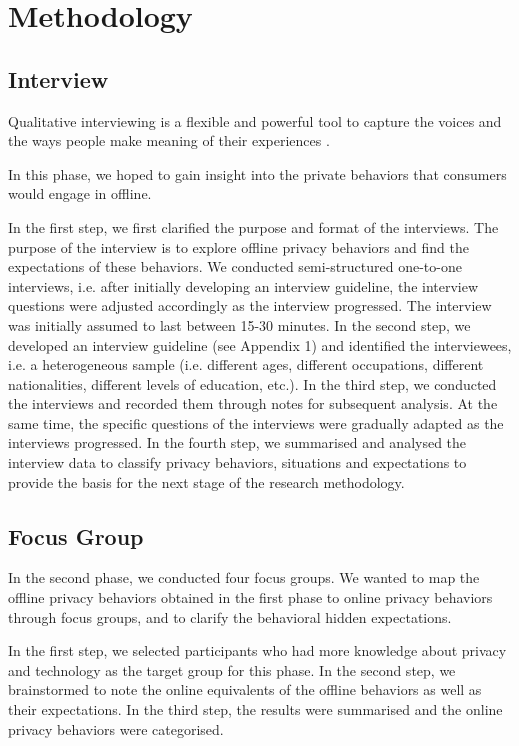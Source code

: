 \section{Methodology}
\label{sec:3}

\subsection{Interview}
\label{Label2}

Qualitative interviewing is a flexible and powerful tool to capture the voices and the ways people make meaning of their experiences \cite{fourteen}. 

In this phase, we hoped to gain insight into the private behaviors that consumers would engage in offline. 

In the first step, we first clarified the purpose and format of the interviews. The purpose of the interview is to explore offline privacy behaviors and find the expectations of these behaviors. We conducted semi-structured one-to-one interviews, i.e. after initially developing an interview guideline, the interview questions were adjusted accordingly as the interview progressed. The interview was initially assumed to last between 15-30 minutes. In the second step, we developed an interview guideline (see Appendix 1) and identified the interviewees, i.e. a heterogeneous sample (i.e. different ages, different occupations, different nationalities, different levels of education, etc.). In the third step, we conducted the interviews and recorded them through notes for subsequent analysis. At the same time, the specific questions of the interviews were gradually adapted as the interviews progressed. In the fourth step, we summarised and analysed the interview data to classify privacy behaviors, situations and expectations to provide the basis for the next stage of the research methodology.

\subsection{Focus Group}
\label{Label2}

In the second phase, we conducted four focus groups. We wanted to map the offline privacy behaviors obtained in the first phase to online privacy behaviors through focus groups, and to clarify the behavioral hidden expectations. 

In the first step, we selected participants who had more knowledge about privacy and technology as the target group for this phase. In the second step, we brainstormed to note the online equivalents of the offline behaviors as well as their expectations. In the third step, the results were summarised and the online privacy behaviors were categorised. 

